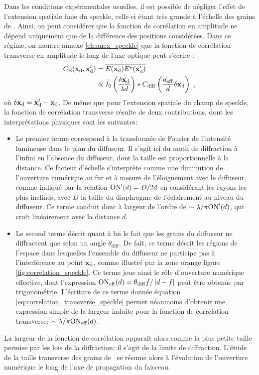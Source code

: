 Dans les conditions expérimentales usuelles, il est possible de négliger l'effet de l'extension spatiale finie du speckle, celle-ci étant très grande à l'échelle des grains de \speckle . Ainsi, on peut considérer que la fonction de corrélation en amplitude ne dépend uniquement que de la différence des positions considérées. Dans ce régime, on montre annexe \ref{ch:anex_speckle} que la fonction de corrélation transverse en amplitude le long de l'axe optique peut s'écrire \citep{gatti2008three}:
\begin{align}
\nonumber C_{\mathrm{E}}(\mathbf{x}_{\mathrm{d}},\mathbf{x}_{\mathrm{d}}') &= \overline{E(\mathbf{x}_{\mathrm{d}}) E^*(\mathbf{x}_{\mathrm{d}}')} \\
& \propto \widetilde{I_0}\left( \frac{\delta\mathbf{x}_{\mathrm{d}}}{\lambda d}\right) \ast C_{\mathrm{diff}}\left( \frac{d_{\mathrm{eff}}}{d} \delta \mathbf{x}_{\mathrm{d}} \right) \text{ ,}
\label{eq:correlation_transverse_speckle}
\end{align}
où $\delta\mathbf{x}_{\mathrm{d}}=\mathbf{x}_{\mathrm{d}}'-\mathbf{x}_{\mathrm{d}}$. De même que pour l'extension spatiale du champ de speckle, la fonction de corrélation transverse résulte de deux contributions, dont les interprétations physiques sont les suivantes:
\begin{itemize}
\item[\textendash] Le premier terme correspond à la transformée de Fourier de l'intensité lumineuse dans le plan du diffuseur. Il s'agit ici du motif de diffraction à l'infini en l'absence du diffuseur, dont la taille est proportionnelle à la distance. Ce facteur d'échelle s'interprète comme une diminution de l'ouverture numérique au fur et à mesure de l'éloignement avec le diffuseur, comme indiqué par la relation $\mathrm{ON}'(d)=D/2d$ en considérant les rayons les plus inclinés, avec $D$ la taille du diaphragme de l'éclairement au niveau du diffuseur. Ce terme conduit donc à largeur de l'ordre de $\sim\lambda / \pi \mathrm{ON}'(d)$, qui croît linéairement avec la distance $d$. 
\item[\textendash] Le second terme décrit quant à lui le fait que les grains du diffuseur ne diffractent que selon un angle $\theta_{\mathrm{diff}}$. De fait, ce terme décrit les régions de l'espace dans lesquelles l'ensemble du diffuseur ne participe pas à l'interférence au point $\mathbf{x}_{\mathrm{d}}$, comme illustré par la zone orange figure \ref{fig:correlation_speckle}. Ce terme joue ainsi le rôle d'ouverture numérique effective, dont l'expression $\mathrm{ON}_{\mathrm{eff}}(d)=\theta_{\mathrm{diff}} f/\left| d-f \right|$ peut être obtenue par trigonométrie. L'écriture de ce terme donnée équation \ref{eq:correlation_transverse_speckle} permet néanmoins d'obtenir une expression simple de la largeur induite pour la fonction de corrélation transverse: $\sim\lambda /\pi \mathrm{ON}_{\mathrm{eff}} (d)$.
\end{itemize}
La largeur de la fonction de corrélation apparaît alors comme la plus petite taille permise par les lois de la diffraction: il s'agit de la limite de diffraction. L'étude de la taille transverse des grains de \speckle\ se résume alors à l'évolution de l'ouverture numérique le long de l'axe de propagation du faisceau.

